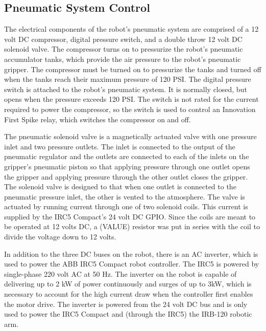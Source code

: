 \documentclass{article}
\begin{document}
\subsection[Pneumatic System Control]{Pneumatic System Control}
The electrical components of the robot{\textquoteright}s pneumatic system are comprised of a 12 volt DC compressor, digital pressure switch, and a double throw 12 volt DC solenoid valve. The compressor turns on to pressurize the robot{\textquoteright}s pneumatic accumulator tanks, which provide the air pressure to the robot{\textquoteright}s pneumatic gripper. The compressor must be turned on to pressurize the tanks and turned off when the tanks reach their maximum pressure of 120 PSI. The digital pressure switch is attached to the robot{\textquoteright}s pneumatic system. It is normally closed, but opens when the pressure exceeds 120 PSI. The switch is not rated for the current required to power the compressor, so the switch is used to control an Innovation First Spike relay, which switches the compressor on and off.

The pneumatic solenoid valve is a magnetically actuated valve with one pressure inlet and two pressure outlets. The inlet is connected to the output of the pneumatic regulator and the outlets are connected to each of the inlets on the gripper{\textquoteright}s pneumatic piston so that applying pressure through one outlet opens the gripper and applying pressure through the other outlet closes the gripper. The solenoid valve is designed to that when one outlet is connected to the pneumatic pressure inlet, the other is vented to the atmosphere. The valve is actuated by running current through one of two solenoid coils. This current is supplied by the IRC5 Compact{\textquoteright}s 24 volt DC GPIO. Since the coils are meant to be operated at 12 volts DC, a (VALUE) resistor was put in series with the coil to divide the voltage down to 12 volts.

In addition to the three DC buses on the robot, there is an AC inverter, which is used to power the ABB IRC5 Compact robot controller. The IRC5 is powered by single-phase 220 volt AC at 50 Hz. The inverter on the robot is capable of delivering up to 2 kW of power continuously and surges of up to 3kW, which is necessary to account for the high current draw when the controller first enables the motor drive. The inverter is powered from the 24 volt DC bus and is only used to power the IRC5 Compact and (through the IRC5) the IRB-120 robotic arm.
\end{document}
